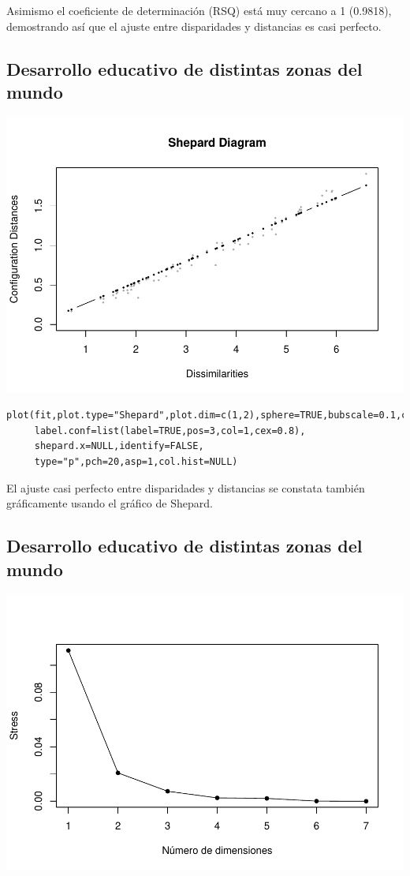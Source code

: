 \documentclass[]{article}
\begin{document}
Asimismo el coeficiente de determinación (RSQ) está muy cercano a 1
(0.9818), demostrando así que el ajuste entre disparidades y distancias
es casi perfecto.

\subsection{Desarrollo educativo de distintas zonas del
mundo}\label{desarrollo-educativo-de-distintas-zonas-del-mundo-7}

\hypertarget{left}{}
\includegraphics{Clase-4_files/figure-latex/unnamed-chunk-20-1.pdf}

\hypertarget{right}{}
\begin{verbatim}
plot(fit,plot.type="Shepard",plot.dim=c(1,2),sphere=TRUE,bubscale=0.1,col=1,
     label.conf=list(label=TRUE,pos=3,col=1,cex=0.8),
     shepard.x=NULL,identify=FALSE,
     type="p",pch=20,asp=1,col.hist=NULL)
\end{verbatim}

El ajuste casi perfecto entre disparidades y distancias se constata
también gráficamente usando el gráfico de Shepard.

\subsection{Desarrollo educativo de distintas zonas del
mundo}\label{desarrollo-educativo-de-distintas-zonas-del-mundo-8}

\hypertarget{left}{}
\includegraphics{Clase-4_files/figure-latex/unnamed-chunk-21-1.pdf}
\end{document}
